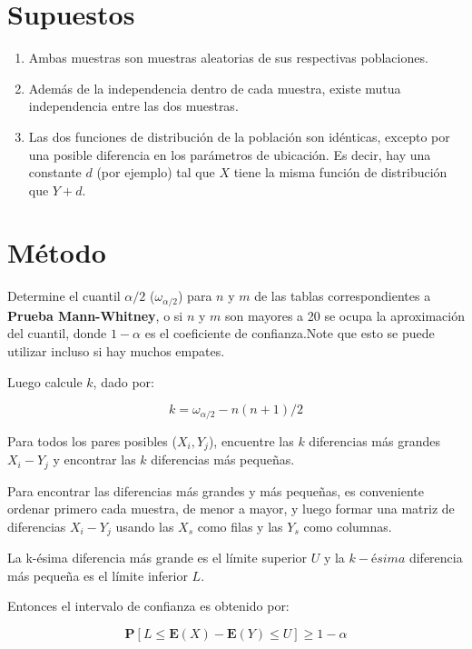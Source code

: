 \documentclass[
  a4paper,
  oneside,
  openany]{book}
\begin{document}
\hypertarget{supuestos-6}{%
\section{Supuestos}\label{supuestos-6}}

\begin{enumerate}
\def\labelenumi{\arabic{enumi})}
\item
  Ambas muestras son muestras aleatorias de sus respectivas poblaciones.
\item
  Además de la independencia dentro de cada muestra, existe mutua independencia entre las dos muestras.
\item
  Las dos funciones de distribución de la población son idénticas, excepto por una posible diferencia en los parámetros de ubicación. Es decir, hay una constante \(d\) (por ejemplo) tal que \(X\) tiene la misma función de distribución que \(Y + d\).
\end{enumerate}

\hypertarget{muxe9todo}{%
\section{Método}\label{muxe9todo}}

Determine el cuantil \(\alpha/2\) (\(\omega_{\alpha/2}\)) para \(n\) y \(m\) de las tablas correspondientes a \textbf{Prueba Mann-Whitney}, o si \(n\) y \(m\) son mayores a 20 se ocupa la aproximación del cuantil, donde \(1-\alpha\) es el coeficiente de confianza.Note que esto se puede utilizar incluso si hay muchos empates.

Luego calcule \(k\), dado por:

\[k= \omega_{\alpha/2}-n(n+1)/2\]

Para todos los pares posibles (\(X_{i},Y_{j}\)), encuentre las \(k\) diferencias más grandes \(X_{i}-Y_{j}\) y encontrar las \(k\) diferencias más pequeñas.

Para encontrar las diferencias más grandes y más pequeñas, es conveniente ordenar primero cada muestra, de menor a mayor, y luego formar una matriz de diferencias \(X_{i}-Y_{j}\) usando las \(X_s\) como filas y las \(Y_s\) como columnas.

La k-ésima diferencia más grande es el límite superior \(U\) y la \(k-ésima\) diferencia más pequeña es el límite inferior \(L\).

Entonces el intervalo de confianza es obtenido por:

\[\mathbf{P}[L\leq \mathbf{E}(X)-\mathbf{E}(Y)\leq U]\geq 1-\alpha\]
\end{document}
